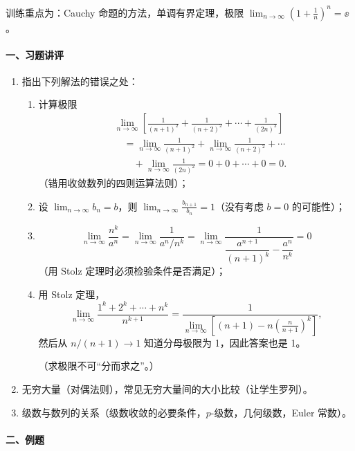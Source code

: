 训练重点为：Cauchy 命题的方法，单调有界定理，极限 $\displaystyle\lim_{n\to\infty}\left(1+\frac1n\right)^n=\ee$。

\paragraph{一、习题讲评}

\begin{enumerate}[label=\arabic*.]
  \item 指出下列解法的错误之处：
  \begin{enumerate}[label=(\arabic*)]
    \item 计算极限
    \begin{align*}
      &\lim_{n\to\infty}\left[\frac1{(n+1)^2}+\frac1{(n+2)^2}+\cdots+\frac1{(2n)^2}\right]\\
      &\quad=\lim_{n\to\infty}\frac1{(n+1)^2}
      +\lim_{n\to\infty}\frac1{(n+2)^2}+\cdots\\
      &\qquad+\lim_{n\to\infty}\frac1{(2n)^2}
      =0+0+\cdots+0=0.
    \end{align*}
    （错用收敛数列的四则运算法则）；
    \item 设 $\displaystyle\lim_{n\to\infty}b_n=b$，则 $\displaystyle\lim_{n\to\infty}\frac{b_{n+1}}{b_n}=1$（没有考虑 $b=0$ 的可能性）；
    \item
    \[
      \lim_{n\to\infty}\frac{n^k}{a^n}
      =\lim_{n\to\infty}\frac1{a^n/n^k}
      =\lim_{n\to\infty}\frac1{\dfrac{a^{n+1}}{(n+1)^k}-\dfrac{a^n}{n^k}}=0
    \]
    （用 Stolz 定理时必须检验条件是否满足）；
    \item 用 Stolz 定理，
    \[
      \lim_{n\to\infty}\frac{1^k+2^k+\cdots+n^k}{n^{k+1}}
      =\frac1{\displaystyle\lim_{n\to\infty}\left[(n+1)-n\left(\frac n{n+1}\right)^k\right]},
    \]
    然后从 $n/(n+1)\to1$ 知道分母极限为 1，因此答案也是 1。

    （求极限不可“分而求之”。）
  \end{enumerate}
  \item 无穷大量（对偶法则），常见无穷大量间的大小比较（让学生罗列）。
  \item 级数与数列的关系（级数收敛的必要条件，$p$-级数，几何级数，Euler 常数）。
\end{enumerate}

\paragraph{二、例题}

